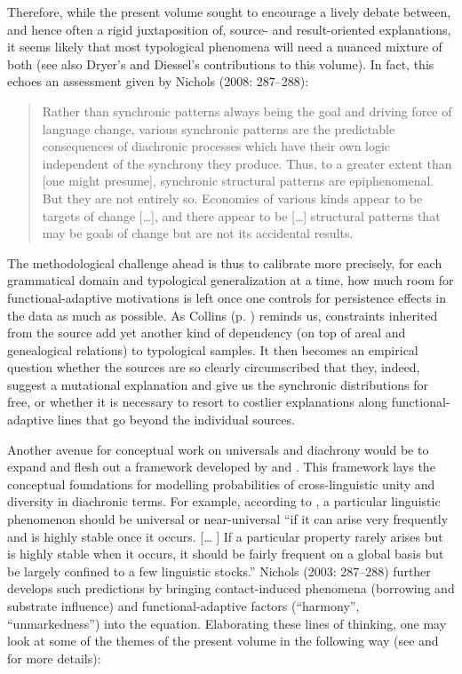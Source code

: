 \documentclass[output=paper]{langsci/langscibook}
\begin{document}
Therefore, while the present volume sought to encourage a lively debate between, and hence often a rigid juxtaposition of, source- and result-oriented explanations, it seems likely that most typological phenomena will need a nuanced mixture of both (see also Dryer’s and Diessel’s contributions to this volume). In fact, this echoes an assessment given by Nichols (2008: 287–288):

\begin{quote}
Rather than synchronic patterns always being the goal and driving force of language change, various synchronic patterns are the predictable consequences of diachronic processes which have their own logic independent of the synchrony they produce. Thus, to a greater extent than [one might presume], synchronic structural patterns are epiphenomenal. But they are not entirely so. Economies of various kinds appear to be targets of change […], and there appear to be […] structural patterns that may be goals of change but are not its accidental results.
\end{quote}

The methodological challenge ahead is thus to calibrate more precisely, for each grammatical domain and typological generalization at a time, how much room for functional-adaptive motivations is left once one controls for persistence effects in the data as much as possible. As Collins (p. \pageref{p:collins:dependency}) reminds us, constraints inherited from the source add yet another kind of dependency (on top of areal and genealogical relations) to typological samples. It then becomes an empirical question whether the sources are so clearly circumscribed that they, indeed, suggest a mutational explanation and give us the synchronic distributions for free, or whether it is necessary to resort to costlier explanations along functional-adaptive lines that go beyond the individual sources.

Another avenue for conceptual work on universals and diachrony would be to expand and flesh out a framework developed by \citet{Greenberg1978_Diachr,Nichols1992,Nichols2003} and \citet{Bickel2013}. This framework lays the conceptual foundations for modelling probabilities of cross-linguistic unity and diversity in diachronic terms. For example, according to \citet[76]{Greenberg1978_Diachr}, a particular linguistic phenomenon should be universal or near-universal “if it can arise very frequently and is highly stable once it occurs. [… ] If a particular property rarely arises but is highly stable when it occurs, it should be fairly frequent on a global basis but be largely confined to a few linguistic stocks.” Nichols (2003: 287–288) further develops such predictions by bringing contact-induced phenomena (borrowing and substrate influence) and functional-adaptive factors (“harmony”, “unmarkedness”) into the equation. Elaborating these lines of thinking, one may look at some of the themes of the present volume in the following way (see \citealt{Grossman2016} and \citealt{GrossmanEtAl2018} for more details):
\end{document}
